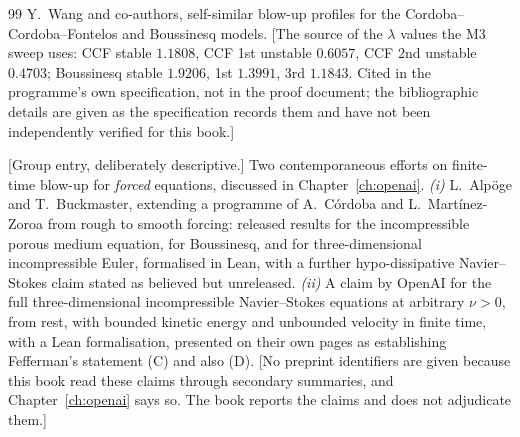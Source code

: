 \begin{thebibliography}{99}
  Y.~Wang and co-authors, self-similar blow-up profiles for the
  Cordoba--Cordoba--Fontelos and Boussinesq models.
  \textsf{[The source of the \(\lambda\) values the M3 sweep uses:
  CCF stable \(1.1808\), CCF 1st unstable \(0.6057\), CCF 2nd unstable
  \(0.4703\); Boussinesq stable \(1.9206\), 1st \(1.3991\), 3rd \(1.1843\).
  Cited in the programme's own specification, not in the proof document;
  the bibliographic details are given as the specification records them and
  have not been independently verified for this book.]}

  \textsf{[Group entry, deliberately descriptive.]}
  Two contemporaneous efforts on finite-time blow-up for \emph{forced}
  equations, discussed in Chapter~\ref{ch:openai}. \emph{(i)} L.~Alp\"oge and
  T.~Buckmaster, extending a programme of A.~C\'ordoba and
  L.~Mart\'inez-Zoroa from rough to smooth forcing: released results for the
  incompressible porous medium equation, for Boussinesq, and for
  three-dimensional incompressible Euler, formalised in Lean, with a further
  hypo-dissipative Navier--Stokes claim stated as believed but unreleased.
  \emph{(ii)} A claim by OpenAI for the full three-dimensional incompressible
  Navier--Stokes equations at arbitrary \(\nu>0\), from rest, with bounded
  kinetic energy and unbounded velocity in finite time, with a Lean
  formalisation, presented on their own pages as establishing Fefferman's
  statement (C) and also (D).
  \textsf{[No preprint identifiers are given because this book read these
  claims through secondary summaries, and Chapter~\ref{ch:openai} says so.
  The book reports the claims and does not adjudicate them.]}

\end{thebibliography}
